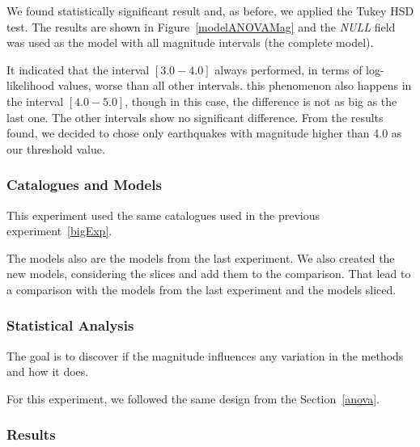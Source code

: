 We found statistically significant result and, as before, we applied the Tukey HSD test. The results are shown in Figure~\ref{modelANOVAMag} and the \textit{NULL} field was used as the model with all magnitude intervals (the complete model).

It indicated that the interval $[3.0-4.0]$ always performed, in terms of log-likelihood values, worse than all other intervals. this phenomenon also happens in the interval $[4.0-5.0]$, though in this case, the difference is not as big as the last one. The other intervals show no significant difference.
From the results found, we decided to chose only earthquakes with magnitude higher than 4.0 as our threshold value.

\subsubsection{Catalogues and Models}
This experiment used the same catalogues used in the previous experiment~\ref{bigExp}. 

The models also are the models from the last experiment. We also created the new models, considering the slices and add them to the comparison. That lead to a comparison with the models from the last experiment and the models sliced.


\subsubsection{Statistical Analysis}
The goal is to discover if the magnitude influences any variation in the methods and how it does.

For this experiment, we followed the same design from the Section~\ref{anova}.

\subsubsection{Results}\label{Results}




